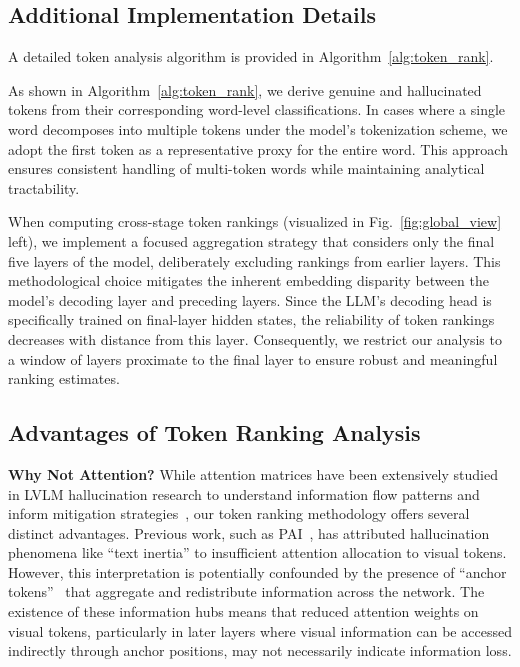 \documentclass{article}
\theoremstyle{plain}
\theoremstyle{definition}
\theoremstyle{remark}
\begin{document}
\subsection{Additional Implementation Details}
A detailed token analysis algorithm is provided in Algorithm~\ref{alg:token_rank}.

 As shown in Algorithm~\ref{alg:token_rank}, we derive genuine and hallucinated tokens from their corresponding word-level classifications. In cases where a single word decomposes into multiple tokens under the model's tokenization scheme, we adopt the first token as a representative proxy for the entire word. This approach ensures consistent handling of multi-token words while maintaining analytical tractability.

 When computing cross-stage token rankings (visualized in Fig.~\ref{fig:global_view} left), we implement a focused aggregation strategy that considers only the final five layers of the model, deliberately excluding rankings from earlier layers. This methodological choice mitigates the inherent embedding disparity between the model's decoding layer and preceding layers. Since the LLM's decoding head is specifically trained on final-layer hidden states, the reliability of token rankings decreases with distance from this layer. Consequently, we restrict our analysis to a window of layers proximate to the final layer to ensure robust and meaningful ranking estimates.

\subsection{Advantages of Token Ranking Analysis}\label{appendix:token_analysis_discussion}

\noindent\textbf{Why Not Attention?} While attention matrices have been extensively studied in LVLM hallucination research to understand information flow patterns and inform mitigation strategies~\cite{opera, pai}, our token ranking methodology offers several distinct advantages. Previous work, such as PAI~\cite{pai}, has attributed hallucination phenomena like ``text inertia'' to insufficient attention allocation to visual tokens. However, this interpretation is potentially confounded by the presence of ``anchor tokens''~\cite{wang-etal-2023-label, opera} that aggregate and redistribute information across the network. The existence of these information hubs means that reduced attention weights on visual tokens, particularly in later layers where visual information can be accessed indirectly through anchor positions, may not necessarily indicate information loss.
\end{document}
